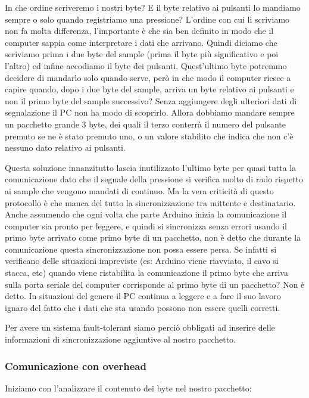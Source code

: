 \documentclass[a4paper,11pt]{article}
\begin{document}
In che ordine scriveremo i nostri byte? E il byte relativo ai pulsanti lo mandiamo sempre o solo quando registriamo una pressione? L'ordine con cui li scriviamo non fa molta differenza, l'importante è che sia ben definito in modo che il computer sappia come interpretare i dati che arrivano. Quindi diciamo che scriviamo prima i due byte del sample (prima il byte più significativo e poi l'altro) ed infine accodiamo il byte dei pulsanti.
Quest'ultimo byte potremmo decidere di mandarlo solo quando serve, però in che modo il computer riesce a capire quando, dopo i due byte del sample, arriva un byte relativo ai pulsanti e non il primo byte del sample successivo? Senza aggiungere degli ulteriori dati di segnalazione il PC non ha modo di scoprirlo. Allora dobbiamo mandare sempre un pacchetto grande 3 byte, dei quali il terzo conterrà il numero del pulsante premuto se ne è stato premuto uno, o un valore stabilito che indica che non c'è nessuno dato relativo ai pulsanti.
\vspace{0.2in}

Questa soluzione innanzitutto lascia inutilizzato l'ultimo byte per quasi tutta la comunicazione dato che il segnale della pressione si verifica molto di rado rispetto ai sample che vengono mandati di continuo. Ma la vera criticità di questo protocollo è che manca del tutto la sincronizzazione tra mittente e destinatario. Anche assumendo che ogni volta che parte Arduino inizia la comunicazione il computer sia pronto per leggere, e quindi si sincronizza senza errori usando il primo byte arrivato come primo byte di un pacchetto, non è detto che durante la comunicazione questa sincronizzazione non possa essere persa. Se infatti si verificano delle situazioni impreviste (es: Arduino viene riavviato, il cavo si stacca, etc) quando viene ristabilita la comunicazione il primo byte che arriva sulla porta seriale del computer corrisponde al primo byte di un pacchetto? Non è detto. In situazioni del genere il PC continua a leggere e a fare il suo lavoro ignaro del fatto che i dati che sta usando possono non essere quelli corretti.

Per avere un sistema fault-tolerant siamo perciò obbligati ad inserire delle informazioni di sincronizzazione aggiuntive al nostro pacchetto.

\subsubsection{Comunicazione con overhead}
Iniziamo con l'analizzare il contenuto dei byte nel nostro pacchetto:
\end{document}

